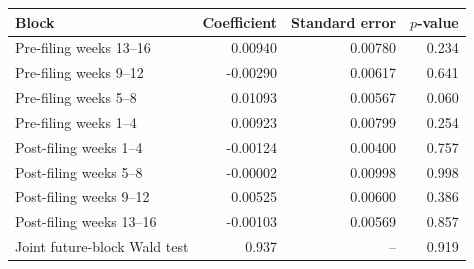 \begin{tabular}{lrrr}
\toprule
Block & Coefficient & Standard error & $p$-value \\
\midrule
Pre-filing weeks 13--16 & 0.00940 & 0.00780 & 0.234 \\
Pre-filing weeks 9--12 & -0.00290 & 0.00617 & 0.641 \\
Pre-filing weeks 5--8 & 0.01093 & 0.00567 & 0.060 \\
Pre-filing weeks 1--4 & 0.00923 & 0.00799 & 0.254 \\
Post-filing weeks 1--4 & -0.00124 & 0.00400 & 0.757 \\
Post-filing weeks 5--8 & -0.00002 & 0.00998 & 0.998 \\
Post-filing weeks 9--12 & 0.00525 & 0.00600 & 0.386 \\
Post-filing weeks 13--16 & -0.00103 & 0.00569 & 0.857 \\
\midrule
Joint future-block Wald test & 0.937 & -- & 0.919 \\
\bottomrule
\end{tabular}
